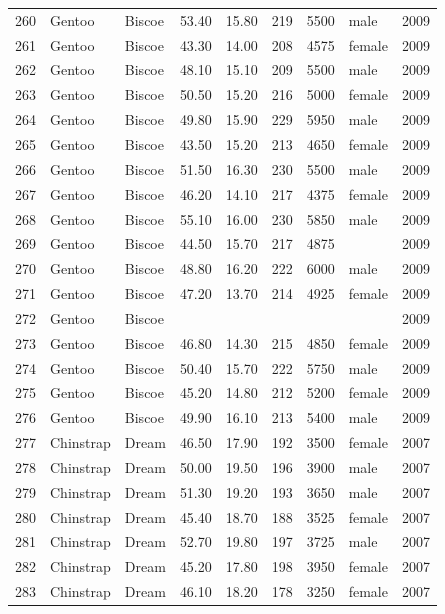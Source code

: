 \documentclass{article}\usepackage[]{graphicx}\usepackage[]{xcolor}
\begin{document}
\begin{table}[ht]
\begin{tabular}{rllrrrrlr}
  260 & Gentoo & Biscoe & 53.40 & 15.80 & 219 & 5500 & male & 2009 \\ 
  261 & Gentoo & Biscoe & 43.30 & 14.00 & 208 & 4575 & female & 2009 \\ 
  262 & Gentoo & Biscoe & 48.10 & 15.10 & 209 & 5500 & male & 2009 \\ 
  263 & Gentoo & Biscoe & 50.50 & 15.20 & 216 & 5000 & female & 2009 \\ 
  264 & Gentoo & Biscoe & 49.80 & 15.90 & 229 & 5950 & male & 2009 \\ 
  265 & Gentoo & Biscoe & 43.50 & 15.20 & 213 & 4650 & female & 2009 \\ 
  266 & Gentoo & Biscoe & 51.50 & 16.30 & 230 & 5500 & male & 2009 \\ 
  267 & Gentoo & Biscoe & 46.20 & 14.10 & 217 & 4375 & female & 2009 \\ 
  268 & Gentoo & Biscoe & 55.10 & 16.00 & 230 & 5850 & male & 2009 \\ 
  269 & Gentoo & Biscoe & 44.50 & 15.70 & 217 & 4875 &  & 2009 \\ 
  270 & Gentoo & Biscoe & 48.80 & 16.20 & 222 & 6000 & male & 2009 \\ 
  271 & Gentoo & Biscoe & 47.20 & 13.70 & 214 & 4925 & female & 2009 \\ 
  272 & Gentoo & Biscoe &  &  &  &  &  & 2009 \\ 
  273 & Gentoo & Biscoe & 46.80 & 14.30 & 215 & 4850 & female & 2009 \\ 
  274 & Gentoo & Biscoe & 50.40 & 15.70 & 222 & 5750 & male & 2009 \\ 
  275 & Gentoo & Biscoe & 45.20 & 14.80 & 212 & 5200 & female & 2009 \\ 
  276 & Gentoo & Biscoe & 49.90 & 16.10 & 213 & 5400 & male & 2009 \\ 
  277 & Chinstrap & Dream & 46.50 & 17.90 & 192 & 3500 & female & 2007 \\ 
  278 & Chinstrap & Dream & 50.00 & 19.50 & 196 & 3900 & male & 2007 \\ 
  279 & Chinstrap & Dream & 51.30 & 19.20 & 193 & 3650 & male & 2007 \\ 
  280 & Chinstrap & Dream & 45.40 & 18.70 & 188 & 3525 & female & 2007 \\ 
  281 & Chinstrap & Dream & 52.70 & 19.80 & 197 & 3725 & male & 2007 \\ 
  282 & Chinstrap & Dream & 45.20 & 17.80 & 198 & 3950 & female & 2007 \\ 
  283 & Chinstrap & Dream & 46.10 & 18.20 & 178 & 3250 & female & 2007 \\ 

\end{tabular}
\end{table}
\end{document}
